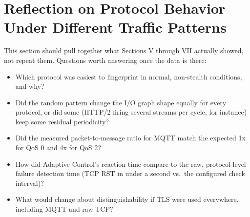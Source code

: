 \section{Reflection on Protocol Behavior Under Different Traffic Patterns}

This section should pull together what Sections V through VII actually showed,
not repeat them. Questions worth answering once the data is there:

\begin{itemize}
\item Which protocol was easiest to fingerprint in normal, non-stealth
conditions, and why?
\item Did the random pattern change the I/O graph shape equally for every
protocol, or did some (HTTP/2 firing several streams per cycle, for instance)
keep some residual periodicity?
\item Did the measured packet-to-message ratio for MQTT match the expected 1x
for QoS 0 and 4x for QoS 2?
\item How did Adaptive Control's reaction time compare to the raw,
protocol-level failure detection time (TCP RST in under a second vs.\ the
configured check interval)?
\item What would change about distinguishability if TLS were used everywhere,
including MQTT and raw TCP?
\end{itemize}


